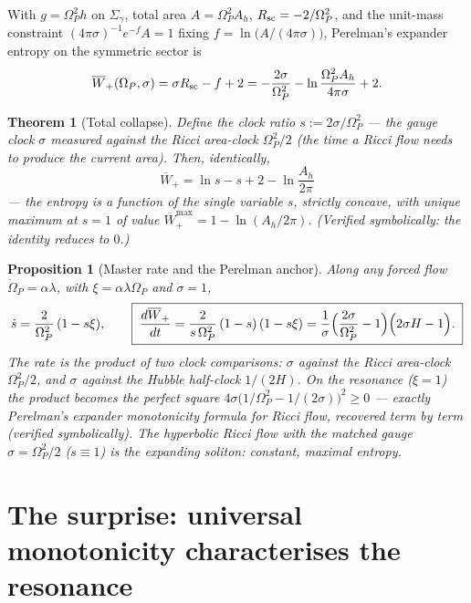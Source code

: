 \documentclass[11pt,a4paper,oneside]{book}
\newcommand{\Op}{\Omega_P}
\newcommand{\Wp}{\overline W_{+}}
\theoremstyle{plain}
\newtheorem{proposition}{Proposition}[chapter]
\newtheorem{theorem}{Theorem}[chapter]
\theoremstyle{definition}
\theoremstyle{remark}
\begin{document}
With $g=\Op^2h$ on $\Sigma_\gamma$, total area $A=\Op^2A_h$, $R_{\rm sc}=-2/\Op^2$, and the unit-mass
constraint $(4\pi\sigma)^{-1}e^{-f}A=1$ fixing $f=\ln\!\bigl(A/(4\pi\sigma)\bigr)$, Perelman's expander
entropy on the symmetric sector is
\begin{equation}
\Wp(\Op,\sigma)=\sigma R_{\rm sc}-f+2
=-\frac{2\sigma}{\Op^2}-\ln\frac{\Op^2A_h}{4\pi\sigma}+2 .
\end{equation}

\begin{theorem}[Total collapse]\label{entropydefect:thm:collapse}
Define the \emph{clock ratio} $s:=2\sigma/\Op^2$ --- the gauge clock $\sigma$ measured against the
Ricci area-clock $\Op^2/2$ (the time a Ricci flow needs to produce the current area). Then,
identically,
\begin{equation}
\boxed{\;\Wp=\ln s-s+2-\ln\frac{A_h}{2\pi}\;}
\end{equation}
--- the entropy is a function of the single variable $s$, strictly concave, with unique maximum at
$s=1$ of value $\Wp^{\max}=1-\ln(A_h/2\pi)$. (Verified symbolically: the identity reduces to $0$.)
\end{theorem}

\begin{proposition}[Master rate and the Perelman anchor]\label{entropydefect:prop:rate}
Along any forced flow $\dot\Op=\alpha\lambda$, with $\xi=\alpha\lambda\Op$ and $\dot\sigma=1$,
\begin{equation}
\dot s=\frac{2}{\Op^2}\,(1-s\xi),
\qquad
\boxed{\;\frac{d\Wp}{dt}
=\frac{2}{s\,\Op^{2}}\,(1-s)\,(1-s\xi)
=\frac1\sigma\Bigl(\frac{2\sigma}{\Op^{2}}-1\Bigr)\Bigl(2\sigma H-1\Bigr).\;}
\end{equation}
The rate is the product of two clock comparisons: $\sigma$ against the Ricci area-clock $\Op^2/2$, and
$\sigma$ against the Hubble half-clock $1/(2H)$. On the resonance ($\xi=1$) the product becomes the
perfect square $4\sigma\bigl(1/\Op^2-1/(2\sigma)\bigr)^2\ge0$ --- \emph{exactly} Perelman's expander
monotonicity formula for Ricci flow, recovered term by term (verified symbolically). The hyperbolic
Ricci flow with the matched gauge $\sigma=\Op^2/2$ ($s\equiv1$) is the expanding soliton: constant,
maximal entropy.
\end{proposition}

\section{The surprise: universal monotonicity characterises the resonance}
\end{document}
